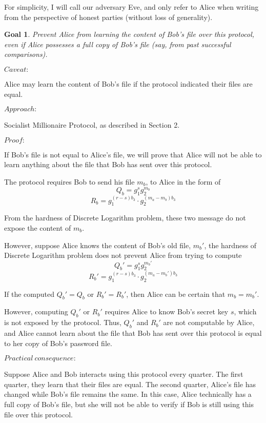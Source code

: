 \documentclass{article}
\newtheorem{goal}{Goal}
\begin{document}
For simplicity, I will call our adversary Eve, and only refer to Alice
when writing from the perspective of honest parties (without loss of generality).

\begin{goal}
Prevent Alice from learning the content of Bob's file over this protocol, even if 
Alice possesses a full copy of Bob's file (say, from past successful comparisons).
\end{goal}

$Caveat:$ 

Alice may learn the content of Bob's file if the protocol indicated their files 
are equal.

$Approach:$ 

Socialist Millionaire Protocol, as described in Section 2.

$Proof:$

If Bob's file is not equal to Alice's file, we will prove that Alice will not be able 
to learn anything about the file that Bob has sent over this protocol.

The protocol requires Bob to send his file $m_b$, to Alice in the form of 
$$Q_b = g_1^sg_2^{m_b}$$ 
$$R_{b} = g_1^{(r-s)b_3} \cdot g_2^{(m_a-m_b)b_3}$$ 

From the hardness of Discrete Logarithm problem, these two message do not expose the content of 
$m_b$.

However, suppose Alice knows the content of Bob's old file, $m_b'$, the hardness of 
Discrete Logarithm problem does not prevent Alice from trying 
to compute $$Q_b' = g_1^sg_2^{m_b'}$$
$$R_{b}' = g_1^{(r-s)b_3} \cdot g_2^{(m_a-m_b')b_3}$$ 

If the computed $Q_b' = Q_b$ or $R_b' = R_b'$, then Alice can be certain that $m_b = m_b'$.

However, computing $Q_b'$ or $R_b'$ requires Alice to know Bob's secret key $s$, which is 
not exposed by the protocol. Thus, $Q_b'$ and $R_b'$ are not 
computable by Alice, and Alice cannot learn about the file that Bob has sent over 
this protocol is equal to her copy of Bob's password file.

$Practical\ consequence:$

Suppose Alice and Bob interacts using this protocol every quarter. The first quarter,
they learn that their files are equal. The second quarter, Alice's file has changed while
Bob's file remains the same. In this case, Alice technically has a full copy of Bob's file,
but she will not be able to verify if Bob is still using this file over this protocol. 
\end{document}
